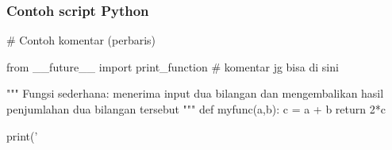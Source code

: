 \begin{frame}[fragile]
\frametitle{Contoh script Python}

\begin{pythoncode}
# Contoh komentar (perbaris)

from __future__ import print_function # komentar jg bisa di sini

"""
Fungsi sederhana: menerima input dua bilangan dan mengembalikan
hasil penjumlahan dua bilangan tersebut
"""
def myfunc(a,b):
    c = a + b
    return 2*c

print('%
\end{pythoncode}


\end{frame}
